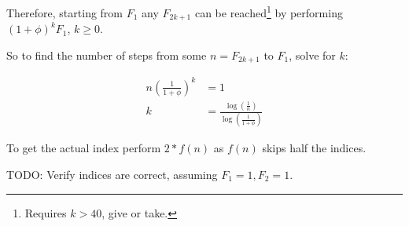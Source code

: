 \documentclass[12pt, letterpaper]{article}
\begin{document}
Therefore, starting from $F_1$ any $F_{2k+1}$ can be reached\footnote{Requires $k>40$, give or take.} 
by performing $(1+\phi)^{k}F_1$, $k\geq 0$.

So to find the number of steps from some $n=F_{2k+1}$ to $F_1$, solve for $k$:

\begin{align*}
    n\left(\frac{1}{1+\phi}\right)^k &= 1\\
    k &= \frac{\log\left(\frac{1}{n}\right)}{\log\left(\frac{1}{1+\phi}\right)}
\end{align*}

To get the actual index perform $2*f(n)$ as $f(n)$ skips half the indices.

TODO: Verify indices are correct, assuming $F_1 = 1, F_2=1$.
\end{document}

